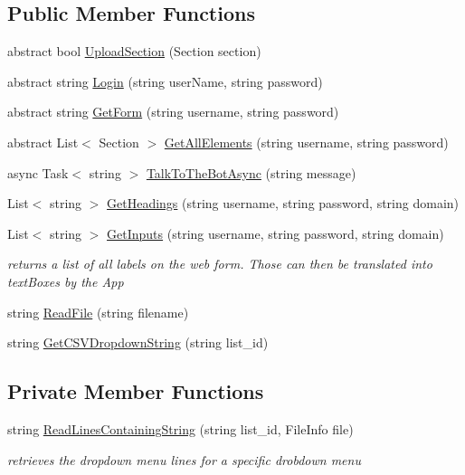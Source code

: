 \subsection*{Public Member Functions}
\begin{DoxyCompactItemize}
\item 
abstract bool \hyperlink{class_wcf_service1_1_1_service_class_add477e49eab8927cc943dfb751dc976a}{Upload\+Section} (Section section)
\item 
abstract string \hyperlink{class_wcf_service1_1_1_service_class_a023c63c6a95132c7f2b9754c1bb41c80}{Login} (string user\+Name, string password)
\item 
abstract string \hyperlink{class_wcf_service1_1_1_service_class_a791350c6bf7ba90f63f95e1b935dde3b}{Get\+Form} (string username, string password)
\item 
abstract List$<$ Section $>$ \hyperlink{class_wcf_service1_1_1_service_class_ac0640daeb28fada4b6f80a2b66b0ec3e}{Get\+All\+Elements} (string username, string password)
\item 
async Task$<$ string $>$ \hyperlink{class_wcf_service1_1_1_service_class_a9c82b9884f5da75aad18624ff0f74115}{Talk\+To\+The\+Bot\+Async} (string message)
\item 
List$<$ string $>$ \hyperlink{class_wcf_service1_1_1_service_class_a4ad3ab638087f1c0deaeafcd5de0592c}{Get\+Headings} (string username, string password, string domain)
\item 
List$<$ string $>$ \hyperlink{class_wcf_service1_1_1_service_class_af7c843fb65336f76c29c1ce7633d3f18}{Get\+Inputs} (string username, string password, string domain)
\begin{DoxyCompactList}\small\item\em returns a list of all labels on the web form. Those can then be translated into text\+Boxes by the App \end{DoxyCompactList}\item 
string \hyperlink{class_wcf_service1_1_1_service_class_a3911ec2648b29d1ed247ee852920ca62}{Read\+File} (string filename)
\item 
string \hyperlink{class_wcf_service1_1_1_service_class_abc1e643d4f507b20ddb1c477e0ec3307}{Get\+C\+S\+V\+Dropdown\+String} (string list\+\_\+id)
\end{DoxyCompactItemize}
\subsection*{Private Member Functions}
\begin{DoxyCompactItemize}
\item 
string \hyperlink{class_wcf_service1_1_1_service_class_ab88a7ee56c72aac3229b737273fbca20}{Read\+Lines\+Containing\+String} (string list\+\_\+id, File\+Info file)
\begin{DoxyCompactList}\small\item\em retrieves the dropdown menu lines for a specific drobdown menu \end{DoxyCompactList}\end{DoxyCompactItemize}
